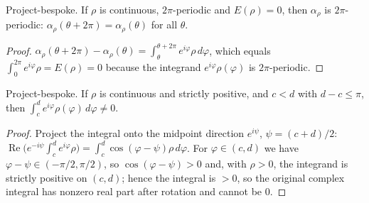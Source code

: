 \begin{lemma}

  \label{lem:reconstruct_periodic}
  Project-bespoke. If $\rho$ is continuous, $2\pi$-periodic and $E(\rho) = 0$,
  then $\alpha_\rho$ is $2\pi$-periodic: $\alpha_\rho(\theta + 2\pi) =
  \alpha_\rho(\theta)$ for all $\theta$.
\end{lemma}
\begin{proof}
  \leanok
  $\alpha_\rho(\theta + 2\pi) - \alpha_\rho(\theta) = \int_\theta^{\theta+2\pi}
  e^{i\varphi}\rho\,d\varphi$, which equals $\int_0^{2\pi} e^{i\varphi}\rho =
  E(\rho) = 0$ because the integrand $e^{i\varphi}\rho(\varphi)$ is $2\pi$-periodic.
\end{proof}

\begin{lemma}

  \label{lem:chord_integral_ne_zero}
  Project-bespoke. If $\rho$ is continuous and strictly positive, and $c < d$ with
  $d - c \le \pi$, then $\int_c^d e^{i\varphi}\rho(\varphi)\,d\varphi \ne 0$.
\end{lemma}
\begin{proof}
  \leanok
  Project the integral onto the midpoint direction $e^{i\psi}$, $\psi = (c+d)/2$:
  $\operatorname{Re}\!\bigl(e^{-i\psi}\int_c^d e^{i\varphi}\rho\bigr) = \int_c^d
  \cos(\varphi-\psi)\rho\,d\varphi$. For $\varphi \in (c,d)$ we have $\varphi-\psi
  \in (-\pi/2, \pi/2)$, so $\cos(\varphi-\psi) > 0$ and, with $\rho > 0$, the
  integrand is strictly positive on $(c,d)$; hence the integral is $> 0$, so the
  original complex integral has nonzero real part after rotation and cannot be $0$.
\end{proof}

